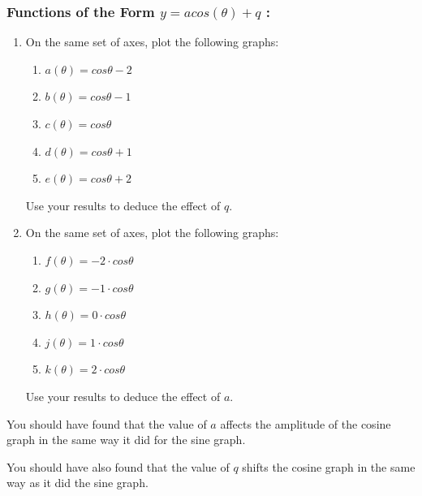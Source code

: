             \subsubsection{  Functions of the Form $y=acos\left(\theta \right)+q$ :}
            \nopagebreak
        \label{m39414*id87553}\begin{enumerate}[noitemsep, label=\textbf{\arabic*}. ] 
            \label{m39414*uid53}\item On the same set of axes, plot the following graphs:
\label{m39414*id87568}\begin{enumerate}[noitemsep, label=\textbf{\alph*}. ] 
            \label{m39414*uid54}\item $a\left(\theta \right)=cos\theta -2$\label{m39414*uid55}\item $b\left(\theta \right)=cos\theta -1$\label{m39414*uid56}\item $c\left(\theta \right)=cos\theta $\label{m39414*uid57}\item $d\left(\theta \right)=cos\theta +1$\label{m39414*uid58}\item $e\left(\theta \right)=cos\theta +2$\end{enumerate}
Use your results to deduce the effect of $q$.
\label{m39414*uid59}\item On the same set of axes, plot the following graphs:
\label{m39414*id87790}\begin{enumerate}[noitemsep, label=\textbf{\alph*}. ] 
            \label{m39414*uid60}\item $f\left(\theta \right)=-2\ensuremath{\cdot}cos\theta $\label{m39414*uid61}\item $g\left(\theta \right)=-1\ensuremath{\cdot}cos\theta $\label{m39414*uid62}\item $h\left(\theta \right)=0\ensuremath{\cdot}cos\theta $\label{m39414*uid63}\item $j\left(\theta \right)=1\ensuremath{\cdot}cos\theta $\label{m39414*uid64}\item $k\left(\theta \right)=2\ensuremath{\cdot}cos\theta $\end{enumerate}
Use your results to deduce the effect of $a$.
\end{enumerate}
        \label{m39414*id88024}You should have found that the value of $a$ affects the amplitude of the cosine graph in the same way it did for the sine graph.\par 
        \label{m39414*id88038}You should have also found that the value of $q$ shifts the cosine graph in the same way as it did the sine graph.\par 
